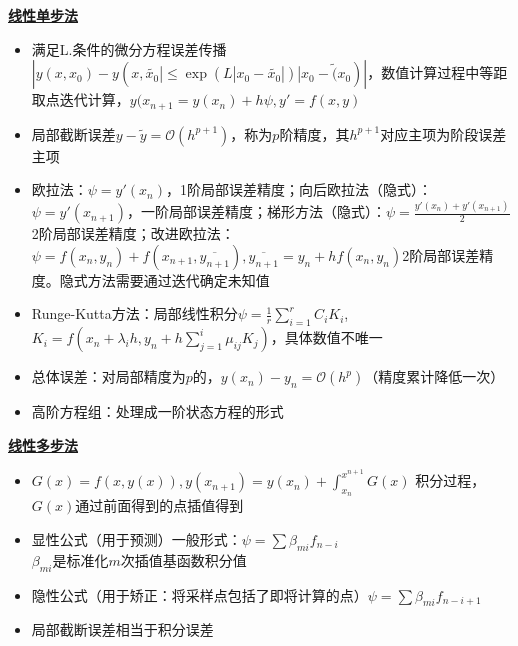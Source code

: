 \documentclass[UTF8,a4paper,landscape,compress]{paper}
\renewcommand{\subsection}[1]{{\small\textbf{\underline{#1}}}\\ }
\newcommand{\List}[1]{\begin{itemize}[fullwidth,itemindent=0em] #1 \end{itemize}}
\begin{document}
\begin{multicols}{4}
    \subsection{线性单步法}
    \List{
        \item {满足L.条件的微分方程误差传播$|y(x,x_0) - y(x,\widetilde{x_0}| \le \exp(L|x_0 - \widetilde{x_0}|)|x_0 - \widetilde(x_0)|$，数值计算过程中等距取点迭代计算，$y(x_{n+1} = y(x_n) + h\psi, y'=f(x,y)$}
        \item {局部截断误差$y -\widetilde y =\mathcal O(h^{p+1})$，称为$p$阶精度，其$h^{p+1}$对应主项为阶段误差主项}
        \item {欧拉法：$\psi =y'(x_n)$，1阶局部误差精度；向后欧拉法（隐式）：$\psi = y'(x_{n+1})$，一阶局部误差精度；梯形方法（隐式）：$\psi = \frac{y'(x_n) + y'(x_{n+1})}{2}$2阶局部误差精度；改进欧拉法：$\psi = f(x_n,y_n) + f(x_{n+1},\overline{y_{n+1}}),\overline{y_{n+1}} = y_n + hf(x_n,y_n)$2阶局部误差精度。隐式方法需要通过迭代确定未知值}
        \item {Runge-Kutta方法：局部线性积分$\displaystyle{\psi = \frac{1}{r} \sum_{i=1}^r C_iK_i}$, $\displaystyle{K_i = f(x_n + \lambda_ih,y_n + h\sum_{j=1}^i\mu_{ij}K_j)}$，具体数值不唯一}
        \item{总体误差：对局部精度为$p$的，$y(x_n) - y_n = \mathcal O(h^p)$（精度累计降低一次）}
        \item {高阶方程组：处理成一阶状态方程的形式}
    }
    \subsection{线性多步法}
    \List{
        \item{$G(x) = f(x,y(x)),y(x_{n+1}) = y(x_n) + \int_{x_n}^{x^{n+1}} G(x) $ 积分过程，$G(x)$通过前面得到的点插值得到}
        \item {显性公式（用于预测）一般形式：$\psi = \sum\beta_{mi}f_{n-i}$\\ $\beta_{mi}$是标准化$m$次插值基函数积分值}
        \item {隐性公式（用于矫正：将采样点包括了即将计算的点）$\psi = \sum\beta_{mi}f_{n-i+1}$}
        \item {局部截断误差相当于积分误差}
    }

\end{multicols}
\end{document}
